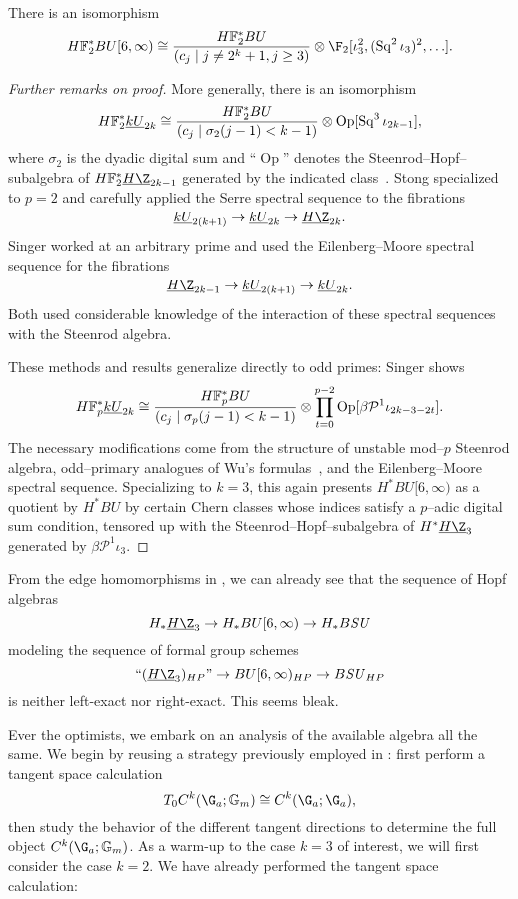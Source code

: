\begin{theorem}\label{HF2BU6Calculation}
There is an isomorphism \[\HFtwo^* BU[6, \infty) \cong \frac{\HFtwo^* BU}{(c_j \mid j \ne 2^k + 1, j \ge 3)} \otimes \F_2[\iota_3^2, (\Sq^2 \iota_3)^2, \ldots].\]
\end{theorem}
\begin{proof}[Further remarks on proof]
More generally, there is an isomorphism \[\HFtwo^* \OS{kU}{2k} \cong \frac{\HFtwo^* BU}{(c_j \mid \sigma_2(j - 1) < k - 1)} \otimes \operatorname{Op}[\Sq^3 \iota_{2k-1}],\] where \(\sigma_2\) is the dyadic digital sum and ``\(\operatorname{Op}\)'' denotes the Steenrod--Hopf--subalgebra of \(\HFtwo^* \OS{H\Z}{2k-1}\) generated by the indicated class~\cite{Singer,Stong}.  Stong specialized to \(p = 2\) and carefully applied the Serre spectral sequence to the fibrations \[\OS{kU}{2(k+1)} \to \OS{kU}{2k} \to \OS{H\Z}{2k}.\]  Singer worked at an arbitrary prime and used the Eilenberg--Moore spectral sequence for the fibrations \[\OS{H\Z}{2k-1} \to \OS{kU}{2(k+1)} \to \OS{kU}{2k}.\]  Both used considerable knowledge of the interaction of these spectral sequences with the Steenrod algebra.

These methods and results generalize directly to odd primes: Singer shows \[\HFp^* \OS{kU}{2k} \cong \frac{\HFp^* BU}{(c_j \mid \sigma_p(j-1) < k-1)} \otimes \prod_{t=0}^{p-2} \operatorname{Op}[\beta \mathcal P^1 \iota_{2k-3-2t}].\]  The necessary modifications come from the structure of unstable mod--\(p\) Steenrod algebra, odd--primary analogues of Wu's formulas~\cite{Shay}, and the Eilenberg--Moore spectral sequence.  Specializing to \(k = 3\), this again presents \(H^* BU[6, \infty)\) as a quotient by \(H^* BU\) by certain Chern classes whose indices satisfy a \(p\)--adic digital sum condition, tensored up with the Steenrod--Hopf--subalgebra of \(H^* \OS{H\Z}{3}\) generated by \(\beta \mathcal P^1 \iota_3\).
\end{proof}

From the edge homomorphisms in , we can already see that the sequence of Hopf algebras \[H_* \OS{H\Z}{3} \to H_* BU[6, \infty) \to H_* B\SU\] modeling the sequence of formal group schemes \[\text{``\((\OS{H\Z}{3})_{HP}\)''} \to BU[6, \infty)_{HP} \to B\SU_{HP}\] is neither left-exact nor right-exact.  This seems bleak.

Ever the optimists, we embark on an analysis of the available algebra all the same.  We begin by reusing a strategy previously employed in : first perform a tangent space calculation \[T_0 C^k(\G_a; \Gm) \cong C^k(\G_a; \G_a),\] then study the behavior of the different tangent directions to determine the full object \(C^k(\G_a; \Gm)\).  As a warm-up to the case \(k = 3\) of interest, we will first consider the case \(k = 2\).  We have already performed the tangent space calculation:

